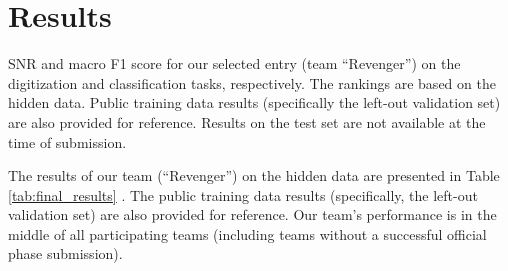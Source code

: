 \section{Results}
\label{sec:results}

\begin{table}[!htp]
\centering

\caption{SNR and macro F1 score for our selected entry (team ``Revenger'') on the digitization and classification tasks, respectively. The rankings are based on the hidden data. Public training data results (specifically the left-out validation set) are also provided for reference. Results on the test set are not available at the time of submission.}
\label{tab:final_results}
\end{table}

The results of our team (``Revenger'') on the hidden data \cite{reyna2024_cinc2024_database} are presented in Table \ref{tab:final_results}
. The public training data results (specifically, the left-out validation set) are also provided for reference. Our team's performance is in the middle of all participating teams (including teams without a successful official phase submission).
